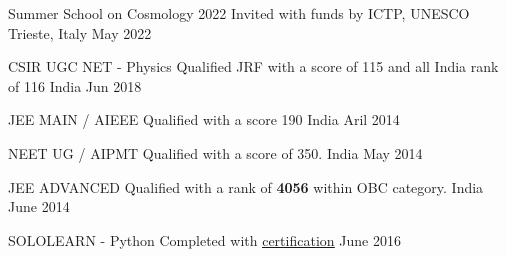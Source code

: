 



\begin{cvhonors}


\cvhonor
{Summer School on Cosmology 2022}
{Invited with funds by ICTP, UNESCO}
{Trieste, Italy}
{May 2022}



\cvhonor
{CSIR UGC NET - Physics} %
{Qualified JRF with a score of 115 and all India rank of 116} %
{India} %
{Jun 2018 } %

\cvhonor
{JEE MAIN / AIEEE}
{Qualified with a score 190} %
{India} %
{Aril 2014 } %



\cvhonor
{NEET UG / AIPMT} %
{Qualified with a score of 350.} %
{India} %
{May 2014 } %


\cvhonor
{JEE ADVANCED} %
{Qualified with a rank of \textbf{4056} within OBC category.} %
{India} %
{June 2014 } %


\cvhonor
{SOLOLEARN - Python} %
{Completed with \href{https://www.sololearn.com/Certificate/1073-553168/pdf/}{\underline{certification}}} %
{} %
{June 2016} %


\end{cvhonors}
